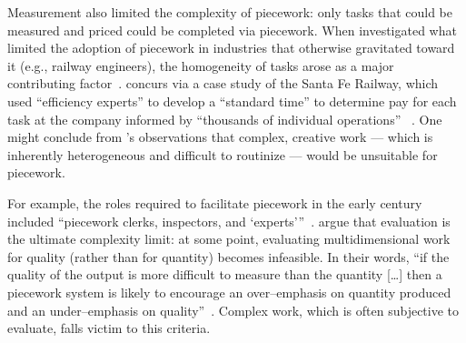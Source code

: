 \documentclass[trackingWork]{subfiles}
\begin{document}


Measurement also limited the complexity of piecework:
only tasks that could be measured and priced could be completed via piecework. 
When \citeauthor{Brown01041990} investigated
what limited the adoption of piecework in industries that otherwise gravitated toward it
(e.g., railway engineers),
the homogeneity of tasks arose as a major contributing factor~\cite{Brown01041990}.
\citeauthor{10.2307/23702539} concurs via a case study of the Santa Fe Railway,
which used ``efficiency experts'' to develop a ``standard time''
to determine pay for each task at the company informed by
``thousands of individual operations''%
~\cite{10.2307/23702539}.
One might conclude from \citeauthor{10.2307/23702539}'s observations that
complex, creative work
--- which is inherently heterogeneous and difficult to routinize ---
would be unsuitable for piecework.

For example, the roles required to facilitate piecework in the early  century included ``piecework clerks, inspectors, and `experts'''~\cite{10.2307/23702539}.
\citeauthor{hart2016rise} argue that evaluation is the ultimate complexity limit:
at some point, evaluating multidimensional work for quality
(rather than for quantity) becomes infeasible.
In their words,
``if the quality of the output is more difficult to measure than the quantity [\ldots]
then a piecework system is likely to encourage
an over--emphasis on quantity produced and an under--emphasis on quality''~\cite{hart2016rise}.
Complex work, which is often subjective to evaluate, falls victim to this criteria.
\end{document}
